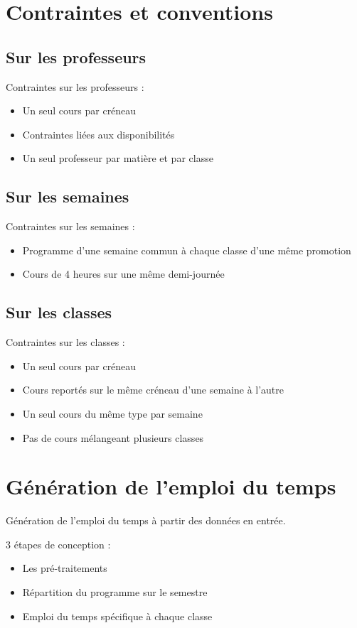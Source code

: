 \documentclass{beamer}
\begin{document}
\section{Contraintes et conventions}

\subsection{Sur les professeurs}
\begin{frame}
Contraintes sur les professeurs : 
\begin{itemize}
\item Un seul cours par créneau
\item Contraintes liées aux disponibilités
\item Un seul professeur par matière et par classe
\end{itemize}
\end{frame}

\subsection{Sur les semaines}
\begin{frame}
Contraintes sur les semaines : 
\begin{itemize}
\item Programme d'une semaine commun à chaque classe d'une même promotion
\item Cours de 4 heures sur une même demi-journée
\end{itemize}
\end{frame}

\subsection{Sur les classes}
\begin{frame}
Contraintes sur les classes : 
\begin{itemize}
\item Un seul cours par créneau
\item Cours reportés sur le même créneau d'une semaine à l'autre
\item Un seul cours du même type par semaine
\item Pas de cours mélangeant plusieurs classes
\end{itemize}
\end{frame}



\section{Génération de l'emploi du temps}
\begin {frame}
Génération de l'emploi du temps à partir des données en entrée.

3 étapes de conception : 
\begin{itemize}
\item Les pré-traitements
\item Répartition du programme sur le semestre
\item Emploi du temps spécifique à chaque classe
\end{itemize}
\end{frame}
\end{document}
